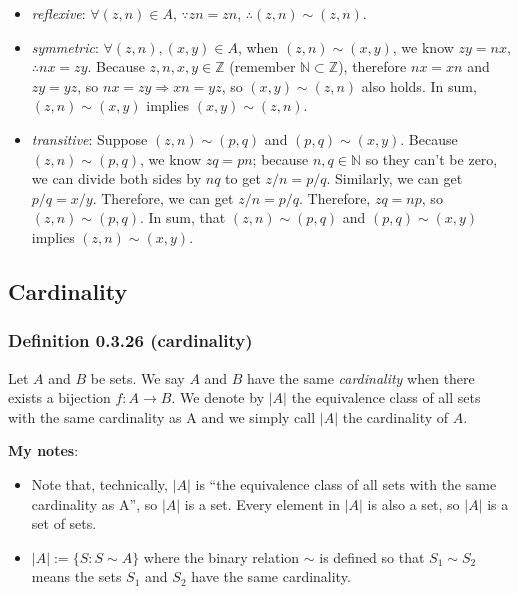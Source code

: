\documentclass[12pt, letterpaper, oneside]{book}
\begin{document}
\begin{itemize}
  \item \textit{reflexive}: $\forall (z, n) \in A$, $\because zn = zn$,
    $\therefore (z, n) \sim (z, n)$.
  \item \textit{symmetric}: $\forall (z, n), (x, y) \in A$, when $(z, n) \sim
    (x, y)$, we know $zy = nx$, $\therefore nx = zy$. Because $z, n, x, y \in
    \mathbb{Z}$ (remember $\mathbb{N} \subset \mathbb{Z}$), therefore $nx = xn$
    and $zy = yz$, so $nx = zy \Rightarrow xn = yz$, so $(x, y) \sim (z, n)$
    also holds. In sum, $(z, n) \sim (x, y)$ implies $(x, y) \sim (z, n)$.
  \item \textit{transitive}: Suppose $(z, n) \sim (p, q)$ and $(p, q) \sim
    (x, y)$. Because $(z, n) \sim (p, q)$, we know $zq = pn$; because $n, q \in
    \mathbb{N}$ so they can't be zero, we can divide both sides by $nq$ to get
    $z/n = p/q$. Similarly, we can get $p/q = x/y$. Therefore, we can get $z/n
    = p/q$. Therefore, $zq = np$, so $(z, n) \sim (p, q)$. In sum, that $(z, n)
    \sim (p, q)$ and $(p, q) \sim (x, y)$ implies $(z, n) \sim (x, y)$.
\end{itemize}

\subsection{Cardinality}

\subsubsection*{Definition 0.3.26 (cardinality)}

Let $A$ and $B$ be sets. We say $A$ and $B$ have the same \textit{cardinality}
when there exists a bijection $f: A \rightarrow B$. We denote by $|A|$ the
equivalence class of all sets with the same cardinality as A and we simply call
$|A|$ the cardinality of $A$.

\colorbox{lime!100}{\textbf{My notes}}:
\begin{itemize}
  \item Note that, technically, $|A|$ is ``the equivalence class of all sets
    with the same cardinality as A'', so $|A|$ is a set. Every element in $|A|$
    is also a set, so $|A|$ is a set of sets.
  \item $|A|:= \{S: S \sim A\}$ where the binary relation $\sim$ is defined so
    that $S_1 \sim S_2$ means the sets $S_1$ and $S_2$ have the same
    cardinality.
\end{itemize}
\end{document}

